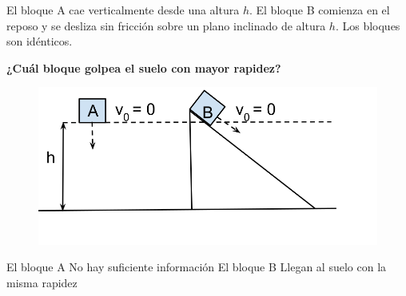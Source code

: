 El bloque A cae verticalmente desde una altura $h$. El bloque B
comienza en el reposo y se desliza sin fricción sobre un plano inclinado de
altura $h$. Los bloques son idénticos.

\textbf{¿Cuál bloque golpea el suelo con mayor rapidez?}

\begin{minipage}{0.3\textwidth}
    \begin{figure}[H]
        \includegraphics[width=\linewidth]{../images/f0bf197148397e9e0f833a29b1c58363c3a1ccb2}
    \end{figure}
\end{minipage}\hfill
\begin{minipage}{0.65\textwidth}
    \begin{choices}
        \choice El bloque A
        \choice No hay suficiente información
        \choice El bloque B
        \CorrectChoice Llegan al suelo con la misma rapidez
    \end{choices}
\end{minipage}